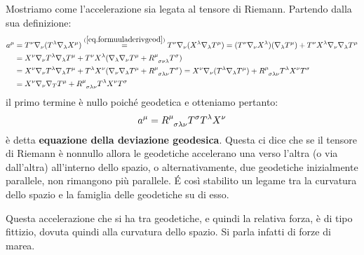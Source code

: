 Mostriamo come l'accelerazione sia legata al tensore di Riemann. Partendo dalla sua definizione:
\begin{align*}
    a^\mu &= T^\nu\nabla_\nu (T^\lambda \nabla_\lambda X^\mu) \overset{(\ref{eq.formuuladerivgeod})}{=} T^\nu \nabla_\nu (X^\lambda \nabla_\lambda T^\mu )
    =(T^\nu\nabla_\nu X^\lambda)(\nabla_\lambda T^\mu) + T^\nu X^\lambda\nabla_\nu \nabla_\lambda T^\mu \\ &= X^\nu\nabla_\nu T^\lambda \nabla_\lambda T^\mu + T^\nu X^\lambda( \nabla_\lambda \nabla_\nu T^\mu + \tensor{R}{^\mu_{\sigma\nu\lambda}}T^\sigma) \\
    &= X^\nu\nabla_\nu T^\lambda \nabla_\lambda T^\mu + T^\lambda X^\nu( \nabla_\nu \nabla_\lambda T^\mu + \tensor{R}{^\mu_{\sigma\lambda\nu}}T^\sigma)
    = X^\nu\nabla_\nu (T^\lambda\nabla_\lambda T^\mu) + \tensor{R}{^\mu_{\sigma\lambda\nu}}T^\lambda X^\nu T^\sigma\\
    &= X^\nu \nabla_\nu \nabla_T T^\mu + \tensor{R}{^\mu_{\sigma\lambda\nu}}T^\lambda X^\nu T^\sigma
\end{align*}
il primo termine è nullo poiché geodetica e otteniamo pertanto:
\begin{equation} 
    a^\mu = \tensor{R}{^\mu_{\sigma\lambda\nu}} T^\sigma T^\lambda X^\nu
    \label{eq.deviazionegeodesica}
\end{equation}
è detta \textbf{equazione della deviazione geodesica}. Questa ci dice che se il tensore di Riemann è nonnullo allora le geodetiche accelerano una verso l'altra (o via dall'altra) all'interno dello spazio, o alternativamente, due geodetiche inizialmente parallele, non rimangono più parallele. \'E così stabilito un legame tra la curvatura dello spazio e la famiglia delle geodetiche su di esso.

Questa accelerazione che si ha tra geodetiche, e quindi la relativa forza, è di tipo fittizio, dovuta quindi alla curvatura dello spazio. Si parla infatti di forze di marea.

